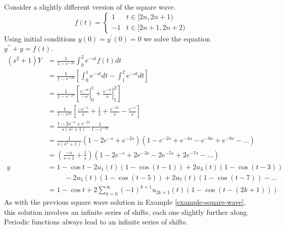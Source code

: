 \documentclass[fleqn,letterpaper]{report}
\begin{document}
\begin{example}
Consider a slightly different version of the square wave.
\begin{equation*}
f(t) = \left\{ \begin{matrix} 1 & t \in [2n, 2n+1) \\
-1 & t \in [2n+1, 2n+2) \end{matrix} \right.
\end{equation*}
Using initial conditions $y(0) = y^\prime(0)= 0$ we solve the
equation $y^{\prime \prime} + y = f(t)$. 
\begin{align*}
(s^2+1)Y & = \frac{1}{1-e^{-2s}} \int_0^2 e^{-st} f(t) dt \\
& = \frac{1}{1-e^{-2s}} \left[ \int_0^1 e^{-st} dt - \int_1^2
e^{-st} dt \right] \\
& = \frac{1}{1-e^{-2s}} \left[ \left. \frac{e^{-st}}{-s}
\right|_0^1 + \left. \frac{e^{-st}}{s} \right|_1^2 \right] \\
& = \frac{1}{1-e^{2s}} \left[ \frac{-e^{-s}}{s} + \frac{1}{s} +
\frac{e^{-2s}}{s} - \frac{e^{-s}}{s} \right] \\
& = \frac{1-2s^{-s} + e^{-2s}}{s(s^2+1)} \frac{1}{1-e^{-2s}} \\
& = \frac{1}{s(s^2+1)} (1-2e^{-s} + e^{-2s}) ( 1 - e^{-2s} +
e^{-4s} - e^{-6s} + e^{-8s} - \ldots ) \\
& = \left( \frac{-s}{s+1} + \frac{1}{s} \right) (1 - 2e^{-s} +
2e^{-3s} - 2e^{-5s} + 2e^{-7s} - \ldots )
\\
y & = 1 - \cos t - 2u_1(t) (1-\cos(t-1)) + 2u_3(t) (1-\cos(t-3))
\\
& \hspace{1cm} - 2u_5 (t) (1-\cos(t-5)) + 2 u_7(t) (1 - \cos
(t-7) ) - \ldots \\
& = 1 - \cos t + 2\sum_{k=0}^\infty (-1)^{k+1} u_{2k+1} (t) (1 -
\cos(t-(2k+1)))
\end{align*}
As with the previous square wave solution in Example
\ref{example-square-wave}, this solution
involves an infinite series of shifts, each one slightly
further along. Periodic functions always lead to an infinite
series of shifts.
\end{example}
\end{document}

